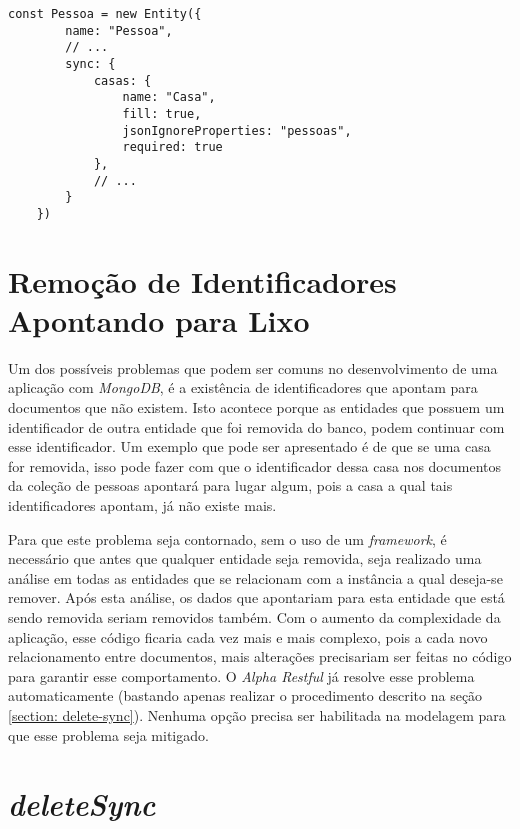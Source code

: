 \begin{lstlisting}[style=ES6, caption={Modelagem de Pessoa com \textit{required}\label{lst: required-alpha-restful}}]
    const Pessoa = new Entity({
        name: "Pessoa",
        // ...
        sync: {
            casas: {
                name: "Casa",
                fill: true,
                jsonIgnoreProperties: "pessoas",
                required: true
            },
            // ...
        }
    })
\end{lstlisting}

\section{Remoção de Identificadores Apontando para Lixo\label{section: identificadores-apontando-para-lixo}}

Um dos possíveis problemas que podem ser comuns no desenvolvimento de uma aplicação com \textit{MongoDB}, é a existência de identificadores que apontam para documentos que não existem. Isto acontece porque as entidades que possuem um identificador de outra entidade que foi removida do banco, podem continuar com esse identificador. Um exemplo que pode ser apresentado é de que se uma casa for removida, isso pode fazer com que o identificador dessa casa nos documentos da coleção de pessoas apontará para lugar algum, pois a casa a qual tais identificadores apontam, já não existe mais.
    
Para que este problema seja contornado, sem o uso de um \textit{framework}, é necessário que antes que qualquer entidade seja removida, seja realizado uma análise em todas as entidades que se relacionam com a instância a qual deseja-se remover. Após esta análise, os dados que apontariam para esta entidade que está sendo removida seriam removidos também. Com o aumento da complexidade da aplicação, esse código ficaria cada vez mais e mais complexo, pois a cada novo relacionamento entre documentos, mais alterações precisariam ser feitas no código para garantir esse comportamento. O \textit{Alpha Restful} já resolve esse problema automaticamente (bastando apenas realizar o procedimento descrito na seção \ref{section: delete-sync}). Nenhuma opção precisa ser habilitada na modelagem para que esse problema seja mitigado.

\section{\textit{deleteSync\label{section: delete-sync}}}

